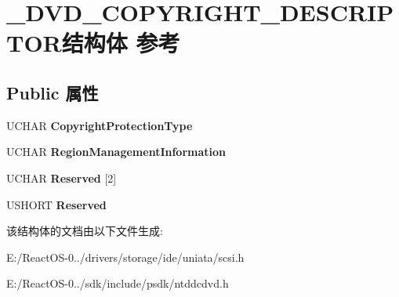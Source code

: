 \hypertarget{struct___d_v_d___c_o_p_y_r_i_g_h_t___d_e_s_c_r_i_p_t_o_r}{}\section{\+\_\+\+D\+V\+D\+\_\+\+C\+O\+P\+Y\+R\+I\+G\+H\+T\+\_\+\+D\+E\+S\+C\+R\+I\+P\+T\+O\+R结构体 参考}
\label{struct___d_v_d___c_o_p_y_r_i_g_h_t___d_e_s_c_r_i_p_t_o_r}
\subsection*{Public 属性}
\begin{DoxyCompactItemize}
\item 
\mbox{\label{struct___d_v_d___c_o_p_y_r_i_g_h_t___d_e_s_c_r_i_p_t_o_r_a6be5a5c18d2137cbe45b8e56475554e9}} 
U\+C\+H\+AR {\bfseries Copyright\+Protection\+Type}
\item 
\mbox{\label{struct___d_v_d___c_o_p_y_r_i_g_h_t___d_e_s_c_r_i_p_t_o_r_a74c6599dc7122b0e16445ea56f67c3ee}} 
U\+C\+H\+AR {\bfseries Region\+Management\+Information}
\item 
\mbox{\label{struct___d_v_d___c_o_p_y_r_i_g_h_t___d_e_s_c_r_i_p_t_o_r_a465f59d277b2c7872f4fe2f073203e8d}} 
U\+C\+H\+AR {\bfseries Reserved} \mbox{[}2\mbox{]}
\item 
\mbox{\label{struct___d_v_d___c_o_p_y_r_i_g_h_t___d_e_s_c_r_i_p_t_o_r_a3de7094cea3514eaa63fff649caad622}} 
U\+S\+H\+O\+RT {\bfseries Reserved}
\end{DoxyCompactItemize}


该结构体的文档由以下文件生成\+:\begin{DoxyCompactItemize}
\item 
E\+:/\+React\+O\+S-\/0../drivers/storage/ide/uniata/scsi.\+h\item 
E\+:/\+React\+O\+S-\/0../sdk/include/psdk/ntddcdvd.\+h\end{DoxyCompactItemize}

